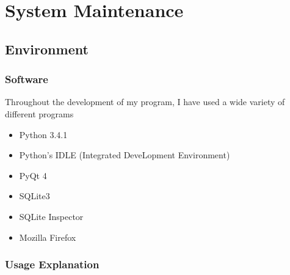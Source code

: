 \chapter{System Maintenance}

\section{Environment}

\subsection{Software}
Throughout the development of my program, I have used a wide variety of different programs\begin{itemize}
    \item Python 3.4.1
    \item Python's IDLE (Integrated DeveLopment Environment)
    \item PyQt 4
    \item SQLite3
    \item SQLite Inspector
    \item Mozilla Firefox
\end{itemize}


\subsection{Usage Explanation}

